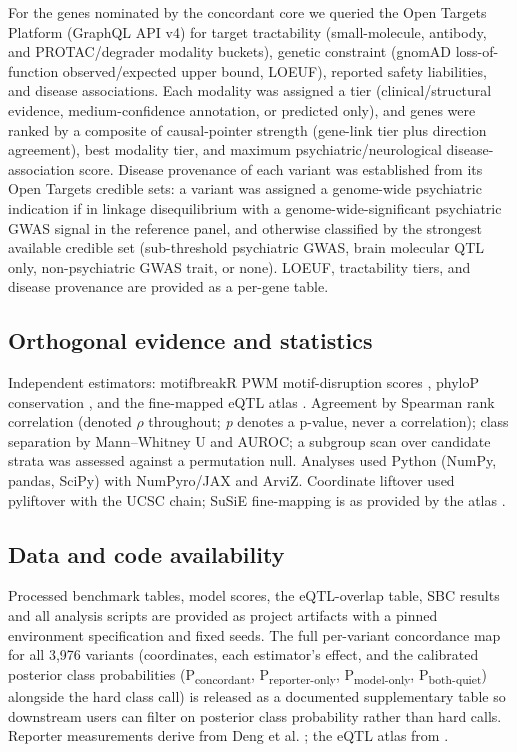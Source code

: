 \documentclass[9pt,twocolumn]{article}
\begin{document}
For the genes nominated by the concordant core we queried the Open Targets Platform (GraphQL API v4) for target tractability (small-molecule, antibody, and PROTAC/degrader modality buckets), genetic constraint (gnomAD loss-of-function observed/expected upper bound, LOEUF), reported safety liabilities, and disease associations. Each modality was assigned a tier (clinical/structural evidence, medium-confidence annotation, or predicted only), and genes were ranked by a composite of causal-pointer strength (gene-link tier plus direction agreement), best modality tier, and maximum psychiatric/neurological disease-association score. Disease provenance of each variant was established from its Open Targets credible sets: a variant was assigned a genome-wide psychiatric indication if in linkage disequilibrium with a genome-wide-significant psychiatric GWAS signal in the reference panel, and otherwise classified by the strongest available credible set (sub-threshold psychiatric GWAS, brain molecular QTL only, non-psychiatric GWAS trait, or none). LOEUF, tractability tiers, and disease provenance are provided as a per-gene table.


\subsection{Orthogonal evidence and statistics}

Independent estimators: motifbreakR PWM motif-disruption scores \cite{r6}, phyloP conservation \cite{r7}, and the fine-mapped eQTL atlas \cite{r14}. Agreement by Spearman rank correlation (denoted $\rho$ throughout; \textit{p} denotes a p-value, never a correlation); class separation by Mann--Whitney U and AUROC; a subgroup scan over candidate strata was assessed against a permutation null. Analyses used Python (NumPy, pandas, SciPy) with NumPyro/JAX \cite{r8} and ArviZ. Coordinate liftover used pyliftover with the UCSC chain; SuSiE fine-mapping is as provided by the atlas \cite{r20}.


\subsection{Data and code availability}

Processed benchmark tables, model scores, the eQTL-overlap table, SBC results and all analysis scripts are provided as project artifacts with a pinned environment specification and fixed seeds. The full per-variant concordance map for all 3,976 variants (coordinates, each estimator's effect, and the calibrated posterior class probabilities (P\textsubscript{concordant}, P\textsubscript{reporter-only}, P\textsubscript{model-only}, P\textsubscript{both-quiet}) alongside the hard class call) is released as a documented supplementary table so downstream users can filter on posterior class probability rather than hard calls. Reporter measurements derive from Deng et al. \cite{r1}; the eQTL atlas from \cite{r14}.
\end{document}
